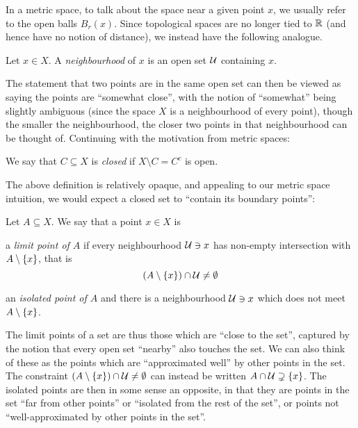 \documentclass[11pt]{article}
\begin{document}
In a metric space, to talk about the space near a given point $x$, we usually refer to the open balls $B_r(x)$. Since topological spaces are no longer tied to $\mathbb{R}$ (and hence have no notion of distance), we instead have the following analogue.
\begin{definition}[Neighbourhood]
    Let $x \in X$. A \emph{neighbourhood} of $x$ is an open set $\mathcal{U}$ containing $x$.
\end{definition}
The statement that two points are in the same open set can then be viewed as saying the points are ``somewhat close'', with the notion of ``somewhat'' being slightly ambiguous (since the space $X$ is a neighbourhood of every point), though the smaller the neighbourhood, the closer two points in that neighbourhood can be thought of. Continuing with the motivation from metric spaces:
\begin{definition}
    We say that $C \subseteq X$ is \emph{closed} if $X \setminus C = C^c$ is open.
\end{definition}


The above definition is relatively opaque, and appealing to our metric space intuition, we would expect a closed set to ``contain its boundary points'':
\begin{definition}
    Let $A \subseteq X$. We say that a point $x \in X$ is
    \begin{enum}
        \item a \emph{limit point of $A$} if every neighbourhood $\mathcal{U} \ni x$ has non-empty intersection with $A \setminus \left\{  x  \right\}$, that is 
        $$
            (A \setminus \left\{  x  \right\}) \cap \mathcal{U} \neq \emptyset
        $$
        \item an \emph{isolated point of $A$} and there is a neighbourhood $\mathcal{U} \ni x$ which does not meet $A \setminus \left\{  x  \right\}$.
    \end{enum}
\end{definition}
The limit points of a set are thus those which are ``close to the set'', captured by the notion that every open set ``nearby'' also touches the set. We can also think of these as the points which are ``approximated well'' by other points in the set. The constraint $(A \setminus \left\{  x  \right\}) \cap \mathcal{U} \neq \emptyset$ can instead be written $A \cap \mathcal{U} \supsetneq \left\{  x  \right\}$. The isolated points are then in some sense an opposite, in that they are points in the set ``far from other points'' or ``isolated from the rest of the set'', or points not ``well-approximated by other points in the set''.
\end{document}
